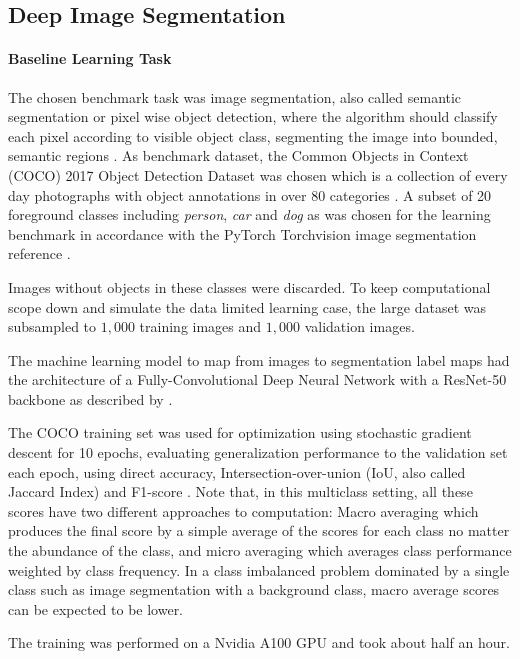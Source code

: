 \documentclass[12pt,fleqn]{article}
\begin{document}
\subsection{Deep Image Segmentation}
\paragraph{Baseline Learning Task}
The chosen benchmark task was image segmentation, also called semantic segmentation or pixel wise object detection, where the algorithm should classify each pixel according to visible object class, segmenting the image into bounded, semantic regions \cite{stockman2001cv}. 
As benchmark dataset, the Common Objects in Context (COCO) 2017 Object Detection Dataset was chosen which is a collection of every day photographs with object annotations in over 80 categories \cite{lin2014coco}.
A subset of 20 foreground classes including \emph{person}, \emph{car} and \emph{dog} as was chosen for the learning benchmark in accordance with the PyTorch Torchvision image segmentation reference \cite{falbel2022torch}.

Images without objects in these classes were discarded.
To keep computational scope down and simulate the data limited learning case, the large dataset was subsampled to $1,000$ training images and $1,000$ validation images.

The machine learning model to map from images to segmentation label maps had the architecture of a Fully-Convolutional Deep Neural Network with a ResNet-50 backbone as described by \citeauthor{shelhamer2017fully} \cite{shelhamer2017fully}.

The COCO training set was used for optimization using stochastic gradient descent for 10 epochs, evaluating generalization performance to the validation set each epoch, using direct accuracy, Intersection-over-union (IoU, also called Jaccard Index) and F1-score \cite{moral2019new}.
Note that, in this multiclass setting, all these scores have two different approaches to computation: Macro averaging which produces the final score by a simple average of the scores for each class no matter the abundance of the class, and micro averaging which averages class performance weighted by class frequency.
In a class imbalanced problem dominated by a single class such as image segmentation with a background class, macro average scores can be expected to be lower.

The training was performed on a Nvidia A100 GPU and took about half an hour.
\end{document}
